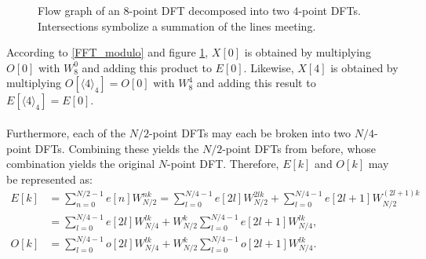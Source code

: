\begin{figure}[H]
\centering
{}
\caption{Flow graph of an $8$-point DFT decomposed into two $4$-point DFTs. Intersections symbolize a summation of the lines meeting.}
\label{fig:4}
\end{figure}

According to \eqref{FFT_modulo} and figure \ref{fig:4}, $X[0]$ is obtained by multiplying $O[0]$ with $W_8^0$ and adding this product to $E[0]$. Likewise, $X[4]$ is obtained by multiplying $O[\langle 4\rangle_4] = O[0]$ with $W_8^4$ and adding this result to $E[\langle 4\rangle_4] = E[0]$.
\\ \\
Furthermore, each of the $N/2$-point DFTs may each be broken into two $N/4$-point DFTs. Combining these yields the $N/2$-point DFTs from before, whose combination yields the original $N$-point DFT. Therefore, $E[k]$ and $O[k]$ may be represented as:
\begin{align*}
E[k] &= \sum_{n=0}^{N/2-1} e[n] W_{N/2}^{nk} = \sum_{l=0}^{N/4-1} e[2l] W_{N/2}^{2lk} + \sum_{l=0}^{N/4-1} e[2l+1] W_{N/2}^{(2l+1)k} \\
&= \sum_{l=0}^{N/4-1} e[2l] W_{N/4}^{lk} + W_{N/2}^k \sum_{l=0}^{N/4-1} e[2l+1] W_{N/4}^{lk}, \\
O[k] &= \sum_{l=0}^{N/4-1} o[2l] W_{N/4}^{lk} + W_{N/2}^k \sum_{l=0}^{N/4-1} o[2l+1] W_{N/4}^{lk}.
\end{align*}

